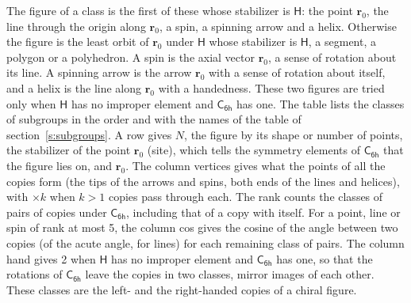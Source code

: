 \documentclass[10pt,a4paper]{article}
\numberwithin{equation}{section}
\newcommand{\grp}[1]{\mathsf{#1}}
\newcommand{\pointr}{\mathbf{r}}
\begin{document}
\leavevmode\label{n:head.figure}The figure of a class is the first of these whose stabilizer is $\grp{H}$: the point $\pointr_0$, the line through the origin along $\pointr_0$, a spin, a spinning arrow and a helix. Otherwise the figure is the least orbit of $\pointr_0$ under $\grp{H}$ whose stabilizer is $\grp{H}$, a segment, a polygon or a polyhedron. A spin is the axial vector $\pointr_0$, a sense of rotation about its line. A spinning arrow is the arrow $\pointr_0$ with a sense of rotation about itself, and a helix is the line along $\pointr_0$ with a handedness. These two figures are tried only when $\grp{H}$ has no improper element and $\grp{C_{6h}}$ has one. The table lists the classes of subgroups in the order and with the names of the table of section~\ref{s:subgroups}. \label{n:head.site}A row gives $N$, the figure by its shape or number of points, the stabilizer of the point $\pointr_0$ (site), which tells the symmetry elements of $\grp{C_{6h}}$ that the figure lies on, and $\pointr_0$. \label{n:head.vertices}The column vertices gives what the points of all the copies form (the tips of the arrows and spins, both ends of the lines and helices), with ${\times}k$ when $k > 1$ copies pass through each. \label{n:head.rank}The rank counts the classes of pairs of copies under $\grp{C_{6h}}$, including that of a copy with itself. \label{n:head.cos}For a point, line or spin of rank at most 5, the column cos gives the cosine of the angle between two copies (of the acute angle, for lines) for each remaining class of pairs. \label{n:head.hand}The column hand gives 2 when $\grp{H}$ has no improper element and $\grp{C_{6h}}$ has one, so that the rotations of $\grp{C_{6h}}$ leave the copies in two classes, mirror images of each other. These classes are the left- and the right-handed copies of a chiral figure.
\end{document}
